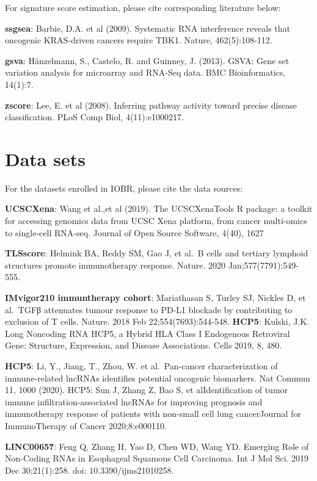 \documentclass[
  12pt,
]{book}
\theoremstyle{definition}
\theoremstyle{definition}
\theoremstyle{definition}
\theoremstyle{definition}
\theoremstyle{remark}
\begin{document}
For signature score estimation, please cite corresponding literature below:

\textbf{ssgsea}: Barbie, D.A. et al (2009). Systematic RNA interference reveals that oncogenic KRAS-driven cancers require TBK1. Nature, 462(5):108-112.

\textbf{gsva}: Hänzelmann, S., Castelo, R. and Guinney, J. (2013). GSVA: Gene set variation analysis for microarray and RNA-Seq data. BMC Bioinformatics, 14(1):7.

\textbf{zscore}: Lee, E. et al (2008). Inferring pathway activity toward precise disease classification. PLoS Comp Biol, 4(11):e1000217.

\hypertarget{data-sets}{%
\section{Data sets}\label{data-sets}}

For the datasets enrolled in IOBR, please cite the data sources:

\textbf{UCSCXena}: Wang et al.,et al (2019). The UCSCXenaTools R package: a toolkit for accessing genomics data from UCSC Xena platform, from cancer multi-omics to single-cell RNA-seq. Journal of Open Source Software, 4(40), 1627

\textbf{TLSscore}: Helmink BA, Reddy SM, Gao J, et al.~B cells and tertiary lymphoid structures promote immunotherapy response. Nature. 2020 Jan;577(7791):549-555.

\textbf{IMvigor210 immuntherapy cohort}: Mariathasan S, Turley SJ, Nickles D, et al.~TGFβ attenuates tumour response to PD-L1 blockade by contributing to exclusion of T cells. Nature. 2018 Feb 22;554(7693):544-548.
\textbf{HCP5}: Kulski, J.K. Long Noncoding RNA HCP5, a Hybrid HLA Class I Endogenous Retroviral Gene: Structure, Expression, and Disease Associations. Cells 2019, 8, 480.

\textbf{HCP5}: Li, Y., Jiang, T., Zhou, W. et al.~Pan-cancer characterization of immune-related lncRNAs identifies potential oncogenic biomarkers. Nat Commun 11, 1000 (2020).
HCP5: Sun J, Zhang Z, Bao S, et alIdentification of tumor immune infiltration-associated lncRNAs for improving prognosis and immunotherapy response of patients with non-small cell lung cancerJournal for ImmunoTherapy of Cancer 2020;8:e000110.

\textbf{LINC00657}: Feng Q, Zhang H, Yao D, Chen WD, Wang YD. Emerging Role of Non-Coding RNAs in Esophageal Squamous Cell Carcinoma. Int J Mol Sci. 2019 Dec 30;21(1):258. doi: 10.3390/ijms21010258.
\end{document}
